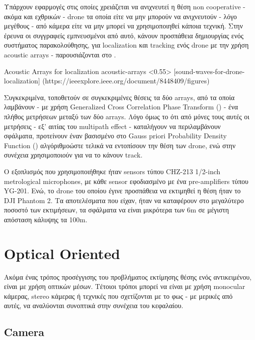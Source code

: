Υπάρχουν εφαρμογές στις οποίες χρειάζεται να ανιχνευτεί η θέση non cooperative - ακόμα και εχθρικών - drone τα οποία είτε να μην μπορούν να ανιχνευτούν - λόγο μεγέθους - από κάμερα είτε να μην μπορεί να χρησιμοποιηθεί κάποια  τεχνική.
Στην έ\-ρ\-ευ\-να \cite{sound-waves-for-drone-localization} οι συγγραφείς εμπνευσμένοι από αυτό, κάνουν προσπάθεια δημιουργίας ενός συστήματος παρακολούθησης, για localization και tracking ενός drone με την χρήση acoustic arrays - παρουσιάζονται στο . 

%
{Acoustic Arrays for localization}%
{acoustic-arrays}%
<0.55>%
[sound-waves-for-drone-localization]%
(https://ieeexplore.ieee.org/document/8448409/figures)

Συγκεκριμένα, τοποθετούν σε συγκεκριμένες θέσεις τα δύο arrays, από τα οποία λα\-μβά\-νουν - με χρήση Generalized Cross Correlation
Phase Transform () - ένα πλήθος μετρήσεων  μεταξύ των δύο arrays. Λόγο όμως το ότι από μόνες τους αυτές οι
μετρήσεις - εξ' αιτίας του multipath effect - καταλήγουν να περιλαμβάνουν σφάλματα, προτείνουν έναν βασισμένο στο Gauss
priori Probability Density Function () αλγόριθμο\udot ώστε τελικά να εντοπίσουν την θέση των drone, ενώ στην συνέχεια χρησιμοποιούν  για να το κάνουν track.

Ο εξοπλισμός που χρησιμοποιήθηκε ήταν sensors τύπου CHZ-213 1/2-inch me\-tro\-lo\-gi\-cal microphones, με κάθε sensor εφοδιασμένο με ένα pre-amplifiers τύπου YG-201. Ενώ, το drone του οποίου έγινε προσπάθεια να εκτιμηθεί η θέση ήταν το DJI Pha\-ntom 2. Τα αποτελέσματα που είχαν, ήταν να καταφέρουν στο μεγαλύτερο ποσοστό των εκτιμήσεων, τα σφάλματα να είναι μικρότερα των 6m σε μέγιστη απόσταση κάλυψης τα 100m.  

\section{Optical Oriented}
Ακόμα ένας τρόπος προσέγγισης του προβλήματος εκτίμησης θέσης ενός αντικειμένου, είναι με χρήση οπτικών μέσων. Τέτοιοι τρόποι μπορεί να είναι με χρήση mo\-no\-cu\-lar κάμερας, stereo κάμερας ή τεχνικές που σχετίζονται με το φως - με μερικές από αυτές, να αναλύονται συνοπτικά στην συνέχεια του κεφαλαίου.

\subsection{Camera}

